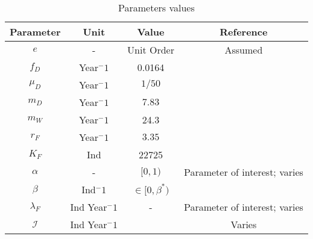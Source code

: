 \documentclass{article}
\newcommand{\lfw}{\lambda_{F}}
\begin{document}
\begin{table}[ht]
\centering
\begin{tabular}{|c|c|c|c|}
\hline 
Parameter & Unit & Value & Reference \\ 
\hline 
$e$ & - & Unit Order & Assumed\\
$f_D$ & Year$^-1$ &0.0164 & \cite{koppert_consommation_1996}\\
$\mu_D$ & Year$^-1$  & $1/50$ & \cite{ins_demographie}\\
$m_D$ & Year$^-1$  &$7.83$ & \cite{avila_interpreting_2019}\\
$m_W$ &Year$^-1$  &24.3 & \cite{avila_interpreting_2019}\\
$r_F$ & Year$^-1$ & $3.35$ & \cite{robinson_intrinsic_1986}\\
$K_F$ & Ind& 22725 & \cite{janson_ecological_1990} \\
$\alpha$ &-&  $[0, 1)$ & Parameter of interest; varies \\
$\beta$ & Ind$^-1$ & $\in [0, \beta^*)$ &  \\
$\lfw$ & Ind Year$^-1$ & - & Parameter of interest; varies \\
$\mathcal{I}$ &  Ind Year$^-1$ & & Varies \\
\hline
\end{tabular}

\caption{Parameters values}
\end{table}
\end{document}
